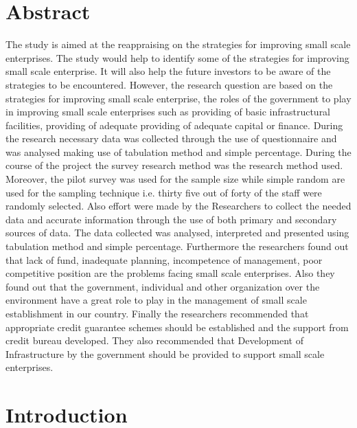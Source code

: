 \documentclass{article}
\begin{document}
\section*{Abstract}
\newcommand\shortlorem{The study is aimed at the reappraising on the strategies for improving small scale enterprises. The study would help to identify some of the strategies for improving small scale enterprise. It will also help the future investors to be aware of the strategies to be encountered. However, the research question are based on the strategies for improving small scale enterprise, the roles of the government to play in improving small scale enterprises such as providing of basic infrastructural facilities, providing of adequate providing of adequate capital or finance. During the research necessary data was collected through the use of questionnaire and was analysed making use of tabulation method and simple percentage. During the course of the project the survey research method was the research method used. Moreover, the pilot survey was used for the sample size while simple random are used for the sampling technique i.e. thirty five out of forty of the staff were randomly selected. Also effort were made by the Researchers to collect the needed data and accurate information through the use of both primary and secondary sources of data. The data collected was analysed, interpreted and presented using tabulation method and simple percentage. Furthermore the researchers found out that lack of fund, inadequate planning, incompetence of management, poor competitive position are the problems facing small scale enterprises. Also they found out that the government, individual and other organization over the environment have a great role to play in the management of small scale establishment in our country. Finally the researchers recommended that appropriate credit guarantee schemes should be established and the support from credit bureau developed. They also recommended that Development of Infrastructure by the government should be provided to support small scale enterprises.}

\shortlorem



\section*{Introduction}
 
\end{document}

